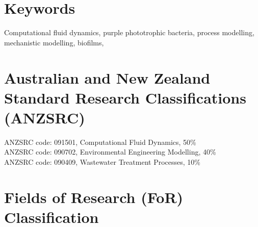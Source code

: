 
\section*{Keywords}


Computational fluid dynamics, purple phototrophic bacteria, process modelling, mechanistic modelling, biofilms, 

\section*{Australian and New Zealand Standard Research Classifications (ANZSRC)}




\noindent
ANZSRC code: 091501, Computational Fluid Dynamics, 50\% \\
ANZSRC code: 090702, Environmental Engineering Modelling, 40\% \\
ANZSRC code: 090409, Wastewater Treatment Processes, 10\%


\section*{Fields of Research (FoR) Classification}
%
%
%

